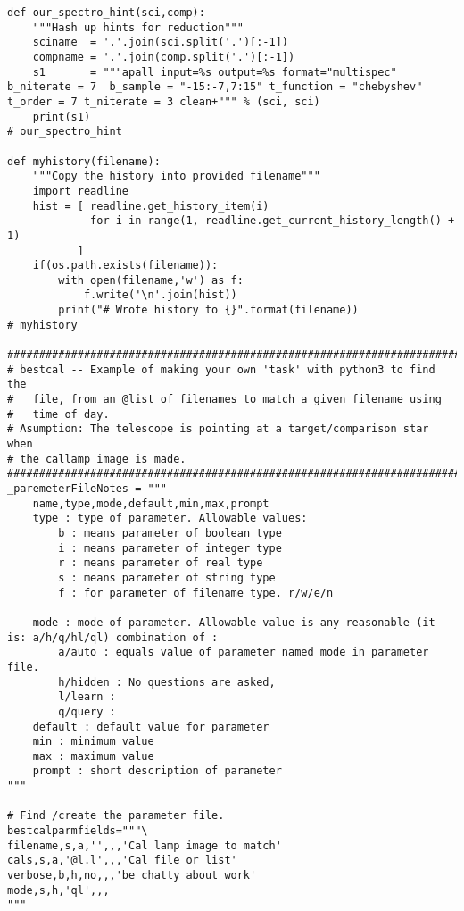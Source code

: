 {\begin{verbatim}
def our_spectro_hint(sci,comp):
    """Hash up hints for reduction"""
    sciname  = '.'.join(sci.split('.')[:-1])
    compname = '.'.join(comp.split('.')[:-1])
    s1       = """apall input=%s output=%s format="multispec" b_niterate = 7  b_sample = "-15:-7,7:15" t_function = "chebyshev" t_order = 7 t_niterate = 3 clean+""" % (sci, sci)
    print(s1)
# our_spectro_hint

def myhistory(filename):
    """Copy the history into provided filename"""
    import readline
    hist = [ readline.get_history_item(i)
             for i in range(1, readline.get_current_history_length() + 1)
           ]
    if(os.path.exists(filename)):
        with open(filename,'w') as f:
            f.write('\n'.join(hist))
        print("# Wrote history to {}".format(filename))
# myhistory

#############################################################################
# bestcal -- Example of making your own 'task' with python3 to find the
#   file, from an @list of filenames to match a given filename using
#   time of day.
# Asumption: The telescope is pointing at a target/comparison star when
# the callamp image is made.
#############################################################################
_paremeterFileNotes = """
    name,type,mode,default,min,max,prompt
    type : type of parameter. Allowable values:
        b : means parameter of boolean type
        i : means parameter of integer type
        r : means parameter of real type
        s : means parameter of string type
        f : for parameter of filename type. r/w/e/n

    mode : mode of parameter. Allowable value is any reasonable (it is: a/h/q/hl/ql) combination of :
        a/auto : equals value of parameter named mode in parameter file.
        h/hidden : No questions are asked,
        l/learn :
        q/query :
    default : default value for parameter
    min : minimum value
    max : maximum value
    prompt : short description of parameter
"""

# Find /create the parameter file.
bestcalparmfields="""\
filename,s,a,'',,,'Cal lamp image to match'
cals,s,a,'@l.l',,,'Cal file or list'
verbose,b,h,no,,,'be chatty about work'
mode,s,h,'ql',,,
"""


\end{verbatim}}
